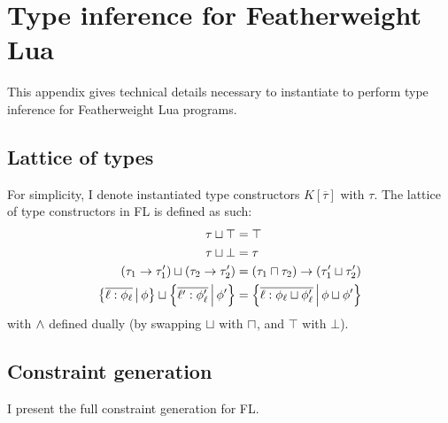\chapter{Type inference for Featherweight Lua}
\label{extra:fl-constraints}

This appendix gives technical details necessary to instantiate \inference{} to perform type inference for Featherweight Lua programs.

\section{Lattice of types}

For simplicity, I denote instantiated type constructors $K[\overline \tau]$ with $\tau$.
The lattice of type constructors in FL is defined as such:
\begin{align*}
    \tau \cjoin \top &= \top \\ 
    \tau \cjoin \bot &= \tau \\
    (\tau_1 \to \tau_1') \cjoin (\tau_2 \to \tau_2') &= (\tau_1 \cmeet \tau_2) \to (\tau_1' \cjoin \tau_2') \\ 
    \flext{\overline{\ell: \phi_\ell}}{\phi} \cjoin \flext{\overline{\ell': \phi_\ell'}}{\phi'} &= \flext{\overline{\ell: \phi_\ell \cjoin \phi_\ell'}}{\phi \cjoin \phi'}
\end{align*}
with $\land$ defined dually (by swapping $\sqcup$ with $\sqcap$, and $\top$ with $\bot$).

\section{Constraint generation}
\label{extra-sec:fl-cstrs}

I present the full constraint generation for FL.

